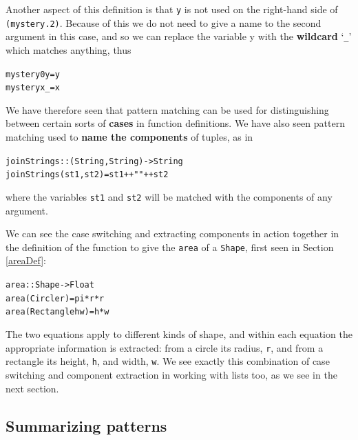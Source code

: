 Another aspect of this definition is that \texttt{y} is not used on the
right-hand side of \texttt{(mystery.2)}. Because of this we do not need to give a name
to the second argument in this case, and so we can replace the variable
y with the \textbf{wildcard} `\verb+_+' which matches anything, thus
\begin{alltt}
mystery 0 y = y
mystery x _ = x
\end{alltt}
We have therefore seen that pattern matching can be used for
distinguishing between certain sorts of 
\textbf{cases} in function definitions. We have also seen pattern matching used
to \textbf{name the components} of tuples, as in
\begin{alltt}
joinStrings :: (String,String) -> String
joinStrings (st1,st2) = st1 ++ "" ++ st2
\end{alltt}
where the variables \texttt{st1} and \texttt{st2} will be matched with
the components of any argument.


We can see the case switching and extracting components in action together in the definition of the function to give the \texttt{area} of a \texttt{Shape}, first seen in Section \ref{areaDef}:
\begin{alltt}
area :: Shape -> Float
area (Circle r)      = pi*r*r
area (Rectangle h w) = h*w
\end{alltt}
The two equations apply to different kinds of shape, and within each equation the appropriate information is extracted: from a circle its radius, \texttt{r}, and from a rectangle its height, \texttt{h}, and width, \texttt{w}. We see exactly this combination of case switching and component extraction in working with lists too, as we see in
the next section.

\subsection*{Summarizing patterns}

